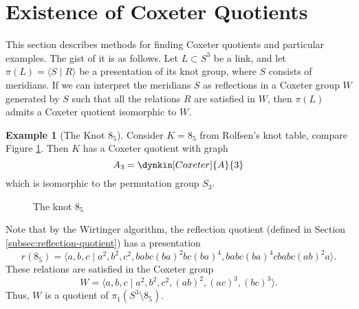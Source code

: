 \documentclass[a4paper]{article}
\theoremstyle{definition}
\newtheorem{example}[theorem]{Example}
\begin{document}
\newpage

\section{Existence of Coxeter Quotients}
This section describes methods for finding Coxeter quotients and particular examples. The gist of it is as follows. Let $L \subset S^3$ be a link, and let $\pi(L) = \langle S \; | \; R \rangle$ be a presentation of its knot group, where $S$ consists of meridians. If we can interpret the meridians $S$ as reflections in a Coxeter group $W$ generated by $S$ such that all the relations $R$ are satisfied in $W$, then $\pi(L)$ admits a Coxeter quotient isomorphic to $W$.

\begin{example}[The Knot $8_5$]
Consider $K = 8_5$ from Rolfsen's knot table, compare Figure \ref{fig:8-5}. Then $K$ has a Coxeter quotient with graph $$A_3 = \dynkin[Coxeter]{A}{3}$$ which is isomorphic to the permutation group $S_3$.

\begin{figure}[ht]
\centering
{}
\caption{The knot $8_5$}
\label{fig:8-5}
\end{figure}

Note that by the Wirtinger algorithm, the reflection quotient (defined in Section \ref{subsec:reflection-quotient}) has a presentation
$$r(8_5) = \langle a, b, c\; | \; a^2, b^2, c^2, babc(ba)^2bc(ba)^4, babc(ba)^4cbabc(ab)^2a \rangle.$$
These relations are satisfied in the Coxeter group
$$W = \langle a, b, c \; | \; a^2, b^2, c^2, (ab)^2, (ac)^3, (bc)^3 \rangle.$$
Thus, $W$ is a quotient of $\pi_1(S^3 \setminus 8_5)$.
\end{example}
\end{document}
